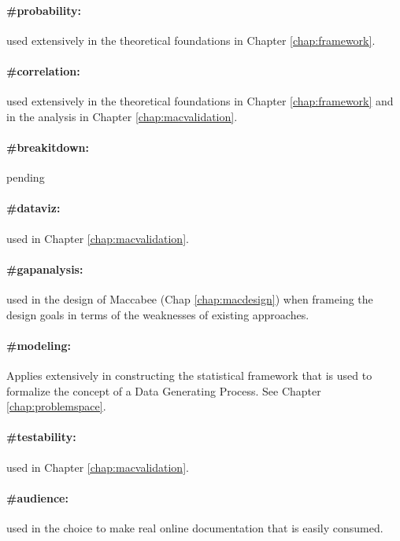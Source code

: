 \documentclass[./main.tex]{subfiles}
\begin{document}
\paragraph*{\textbf{\#probability:}}\label{hc:probability} used extensively in the theoretical foundations in Chapter \ref{chap:framework}.

\paragraph*{\textbf{\#correlation:}}\label{hc:correlation} used extensively in the theoretical foundations in Chapter \ref{chap:framework} and in the analysis in Chapter \ref{chap:macvalidation}.

\paragraph*{\textbf{\#breakitdown:}}\label{hc:breakitdown} pending

\paragraph*{\textbf{\#dataviz:}}\label{hc:dataviz} used in Chapter \ref{chap:macvalidation}.

\paragraph*{\textbf{\#gapanalysis:}}\label{hc:gapanalysis} used in the design of Maccabee (Chap \ref{chap:macdesign}) when frameing the design goals in terms of the weaknesses of existing approaches.

\paragraph*{\textbf{\#modeling:}}\label{hc:modeling} Applies extensively in constructing the statistical framework that is used to formalize the concept of a Data Generating Process. See Chapter \ref{chap:problemspace}.

\paragraph*{\textbf{\#testability:}}\label{hc:testability} used in Chapter \ref{chap:macvalidation}.

\paragraph*{\textbf{\#audience:}}\label{hc:audience} used in the choice to make real online documentation that is easily consumed.
\end{document}
